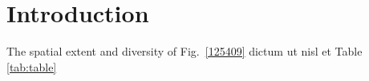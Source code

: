\section{Introduction}
\label{introduction}

The spatial extent and diversity of  Fig.~\ref{125409} dictum ut nisl et Table \ref{tab:table}

